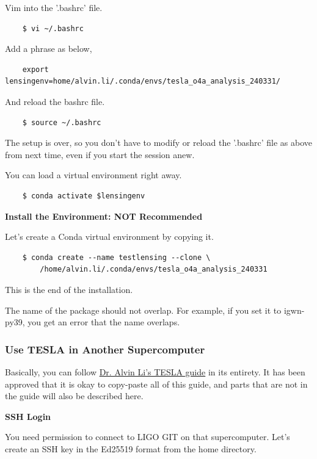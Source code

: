 Vim into the '.bashrc' file.

\begin{verbatim}
    $ vi ~/.bashrc
\end{verbatim}

Add a phrase as below,

\begin{verbatim}
    export lensingenv=home/alvin.li/.conda/envs/tesla_o4a_analysis_240331/
\end{verbatim}

And reload the bashrc file.

\begin{verbatim}
    $ source ~/.bashrc
\end{verbatim}

The setup is over, so you don't have to modify or reload the '.bashrc' file as above from next time, even if you start the session anew.

You can load a virtual environment right away.

\begin{verbatim}
    $ conda activate $lensingenv
\end{verbatim}

\textbf{Install the Environment: NOT Recommended}

Let's create a Conda virtual environment by copying it.

\begin{verbatim}
    $ conda create --name testlensing --clone \
        /home/alvin.li/.conda/envs/tesla_o4a_analysis_240331
\end{verbatim}

This is the end of the installation.

The name of the package should not overlap. For example, if you set it to igwn-py39, you get an error that the name overlaps.

\subsubsection{Use TESLA in Another Supercomputer}

Basically, you can follow \href{https://git.ligo.org/alvin.li/tesla/-/tree/o4a_version_1.0}{Dr. Alvin Li's TESLA guide} in its entirety. It has been approved that it is okay to copy-paste all of this guide, and parts that are not in the guide will also be described here.

\textbf{SSH Login}

You need permission to connect to LIGO GIT on that supercomputer. Let's create an SSH key in the Ed25519 format from the home directory.

